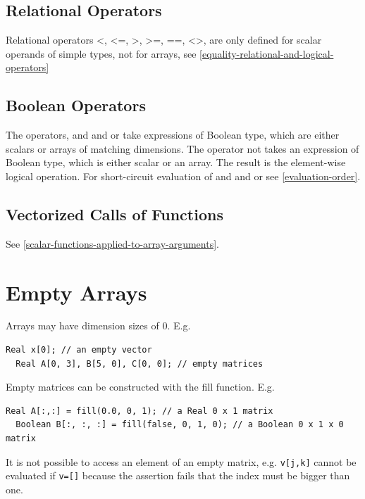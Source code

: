 \documentclass[10pt,a4paper]{report}
\def\doublelabel#1{\label{#1}}
\begin{document}
\subsection{Relational Operators}\doublelabel{relational-operators}

Relational operators \textless{}, \textless{}=, \textgreater{},
\textgreater{}=, ==, \textless{}\textgreater{}, are only defined for
scalar operands of simple types, not for arrays, see \ref{equality-relational-and-logical-operators}

\subsection{Boolean Operators}\doublelabel{boolean-operators}

The operators, and and or take expressions of Boolean type, which are
either scalars or arrays of matching dimensions. The operator not takes
an expression of Boolean type, which is either scalar or an array. The
result is the element-wise logical operation. For short-circuit
evaluation of and and or see \ref{evaluation-order}.

\subsection{Vectorized Calls of Functions}\doublelabel{vectorized-calls-of-functions}

See \ref{scalar-functions-applied-to-array-arguments}.

\section{Empty Arrays}\doublelabel{empty-arrays}

Arrays may have dimension sizes of 0. E.g.

\begin{lstlisting}[language=modelica]
  Real x[0]; // an empty vector
  Real A[0, 3], B[5, 0], C[0, 0]; // empty matrices
\end{lstlisting}
Empty matrices can be constructed with the fill function. E.g.

\begin{lstlisting}[language=modelica]
  Real A[:,:] = fill(0.0, 0, 1); // a Real 0 x 1 matrix
  Boolean B[:, :, :] = fill(false, 0, 1, 0); // a Boolean 0 x 1 x 0 matrix
\end{lstlisting}
It is not possible to access an element of an empty matrix, e.g.
  \lstinline!v[j,k]! cannot be evaluated if \lstinline!v=[]! because the assertion fails
that the index must be bigger than one.
\end{document}
